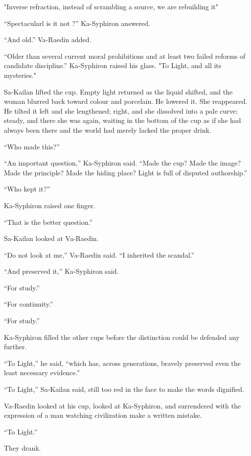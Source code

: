 "Inverse refraction, instead of scrambling a source, we are rebuilding it" \par
“Spectacularl is it not ?” Ka-Syphiron answered. \par
“And old.” Va-Raedin added. \par
“Older than several current moral prohibitions and at least two failed reforms of candidate discipline.” Ka-Syphiron raised his glass.
"To Light,  and all its mysteries." \par

Sa-Kailan lifted the cup. Empty light returned as the liquid shifted, and the woman blurred back toward colour and porcelain. He lowered it. She reappeared. He tilted it left and she lengthened; right, and she dissolved into a pale curve; steady, and there she was again, waiting in the bottom of the cup as if she had always been there and the world had merely lacked the proper drink.\par
“Who made this?”\par
“An important question,” Ka-Syphiron said. “Made the cup? Made the image? Made the principle? Made the hiding place? Light is full of disputed authorship.”\par
“Who kept it?”\par
Ka-Syphiron raised one finger.\par
“That is the better question.”\par
Sa-Kailan looked at Va-Raedin.\par
“Do not look at me,” Va-Raedin said. “I inherited the scandal.”\par
“And preserved it,” Ka-Syphiron said.\par
“For study.”\par
“For continuity.”\par
“For study.”\par
Ka-Syphiron filled the other cups before the distinction could be defended any further.\par
“To Light,” he said, “which has, across generations, bravely preserved even the least necessary evidence.”\par
“To Light,” Sa-Kailan said, still too red in the face to make the words dignified.\par
Va-Raedin looked at his cup, looked at Ka-Syphiron, and surrendered with the expression of a man watching civilization make a written mistake.\par
“To Light.”\par
They drank.\par


